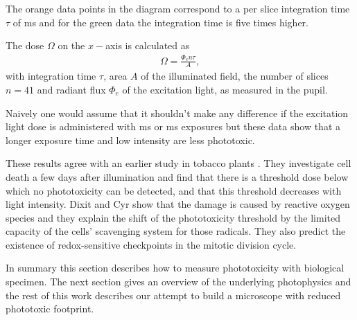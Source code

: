 The orange data points in the diagram correspond to a per slice
integration time $\tau$ of \unit[100]{ms} and for the green data
the integration time is five times higher.

The dose $\Omega$ on the $x-$axis is calculated as
\begin{align}
\Omega = \frac{\Phi_e n \tau}{A},
\end{align}
with integration time $\tau$, area $A$ of the illuminated field, the
number of slices $n=41$ and radiant flux $\Phi_e$ of the excitation
light, as measured in the pupil.

Naively one would assume that it shouldn't make any difference if the
excitation light dose is administered with \unit[100]{ms} or
\unit[500]{ms} exposures but these data show that a longer exposure
time and low intensity are less phototoxic.

These results agree with an earlier study in tobacco plants
\citep{Dixit2003}. They investigate cell death a few days after
illumination and find that there is a threshold dose below which no
phototoxicity can be detected, and that this threshold decreases with
light intensity. Dixit and Cyr show that the damage is caused by
reactive oxygen species and they explain the shift of the
phototoxicity threshold by the limited capacity of the cells'
scavenging system for those radicals. They also predict the existence
of redox-sensitive checkpoints in the mitotic division cycle.


In summary this section describes how to measure phototoxicity with
biological specimen.  The next section gives an overview of the
underlying photophysics and the rest of this work describes our
attempt to build a microscope with reduced phototoxic footprint.



